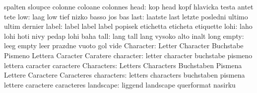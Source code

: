                            spalten                   sloupce
                           colonne                   coloane
                           colonnes
                     head: kop                       head
                           kopf                      hlavicka
                           testa                     antet
                           tete
                      low: laag                      low
                           tief                      nizko
                           basso                     jos
                           bas
                     last: laatste                   last
                           letzte                    posledni
                           ultimo                    ultim
                           dernier
                    label: label                     label
                           label                     popisek
                           etichetta                 eticheta
                           etiquette
                     lohi: laho                      lohi
                           hoti                      nivy
                           pedap                     lohi
                           baha
                     tall: lang                      tall
                           lang                      vysoko
                           alto                      inalt
                           long
                    empty: leeg                      empty
                           leer                      prazdne
                           vuoto                     gol
                           vide
                Character: Letter                    Character
                           Buchstabe                 Pismeno
                           Lettera                   Caracter
                           Caratere
                character: letter                    character
                           buchstabe                 pismeno
                           lettera                   caracter
                           caractere
               Characters: Letters                   Characters
                           Buchstaben                Pismena
                           Lettere                   Caractere
                           Caracteres
               characters: letters                   characters
                           buchstaben                pismena
                           lettere                   caractere
                           caracteres
                landscape: liggend                   landscape
                           querformat                nasirku
